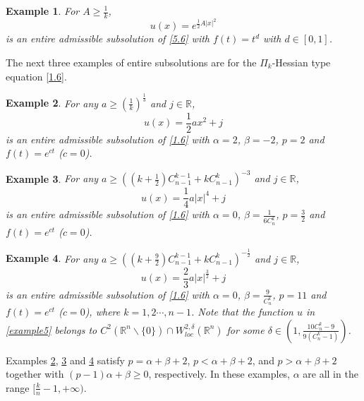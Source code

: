 \documentclass[a4paper,11pt]{amsart}
\theoremstyle{plain}
\newtheorem{Example}{Example}[section]
\theoremstyle{remark}
\numberwithin{equation}{section}
\numberwithin{figure}{section}
\numberwithin{remark}{section}
\begin{document}
\begin{sloppypar}
\begin{Example}\label{Example 6.2}
For $A\ge \frac{1}{k}$, 
\begin{equation}\label{example2}
u(x)=e^{\frac{1}{2}A|x|^2}
\end{equation}
is an entire admissible subsolution of \eqref{5.6} with $f(t)=t^d$ with $d \in [0, 1]$.
\end{Example}

The next three examples of entire subsolutions are for the $\Pi_k$-Hessian type equation \eqref{1.6}.
\begin{Example}\label{Example 6.3}
For any $a \ge \left(\frac{1}{k}\right)^{\frac{1}{3}}$ and $j\in \mathbb{R}$,
\begin{equation}\label{example3}
u(x)=\frac{1}{2}a x^2+j
\end{equation} 
is an entire admissible subsolution of \eqref{1.6} with $\alpha=2$, $\beta=-2$, $p=2$ and $f(t)=e^{c t}$ ($c=0$).
\end{Example}

\begin{Example}\label{Example 6.4}
For any $a \ge \left( (k+\frac{1}{2})C_{n-1}^{k-1}+ k C_{n-1}^k \right)^{-3}$ and $j\in \mathbb{R}$, 
\begin{equation}\label{example4}
u(x)=\frac{1}{4}a |x|^4+j
\end{equation} 
is an entire admissible subsolution of \eqref{1.6} with $\alpha=0$, $\beta=\frac{1}{6C_n^k}$, $p=\frac{3}{2}$ and $f(t)=e^{c t}$ ($c=0$).
\end{Example}

\begin{Example}\label{Example 6.5}
For any $a \ge \left( (k+\frac{9}{2})C_{n-1}^{k-1}+ k C_{n-1}^k \right)^{-\frac{1}{2}}$ and $j\in \mathbb{R}$,
\begin{equation}\label{example5}
u(x)=\frac{2}{3}a |x|^\frac{3}{2}+j
\end{equation} 
is an entire admissible subsolution of \eqref{1.6} with $\alpha=0$, $\beta=\frac{9}{C_n^k}$, $p=11$ and $f(t)=e^{c t}$ ($c=0$), where $k=1, 2 \cdots, n-1$. Note that the function $u$ in \eqref{example5} belongs to $C^2(\mathbb{R}^n\backslash \{0\})\cap W_{loc}^{2,\delta}(\mathbb{R}^n)$ for some $\delta \in (1, \frac{10C_n^k-9}{9(C_n^k-1)})$.
\end{Example}

Examples \ref{Example 6.3}, \ref{Example 6.4} and \ref{Example 6.5} satisfy $p= \alpha+\beta +2$, $p< \alpha+\beta +2$, and $p> \alpha+\beta +2$ together with $(p-1)\alpha +\beta \ge 0$, respectively. In these examples, $\alpha$ are all in the range $[\frac{k}{n}-1, +\infty)$.


\end{sloppypar}
\end{document}
